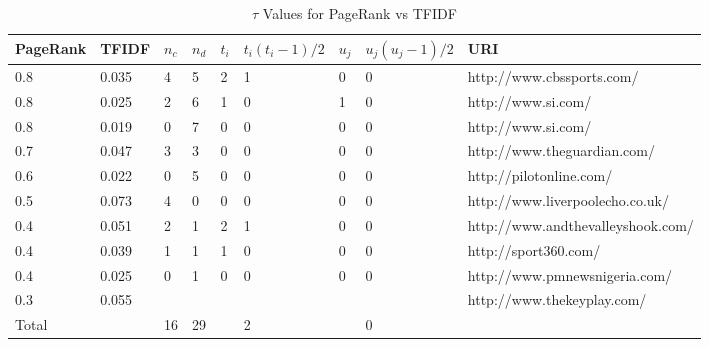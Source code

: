 \begin{table}[!htbp]
\small
\caption{$\tau$ Values for PageRank vs TFIDF} \label{tab:table3}
\begin{center}
\begin{tabular}{l | l | l | l | l | l | l | l | l}
\hline
PageRank & TFIDF & $n_c$ & $n_d$ & $t_i$ & $t_i(t_i - 1)/2$ & $u_j$ & $u_j(u_j - 1)/2$ & URI\\
\hline
0.8	& 0.035	& 4	& 5 & 2 & 1 & 0 & 0 & http://www.cbssports.com/\\
0.8	& 0.025	& 2	& 6	& 1	& 0 & 1 & 0 & http://www.si.com/\\
0.8	& 0.019 & 0	& 7	& 0	& 0 & 0 & 0 & http://www.si.com/\\
0.7	& 0.047 & 3	& 3	& 0	& 0 & 0 & 0 & http://www.theguardian.com/\\
0.6	& 0.022 & 0	& 5	& 0	& 0 & 0 & 0 & http://pilotonline.com/\\
0.5	& 0.073 & 4	& 0	& 0	& 0 & 0 & 0 & http://www.liverpoolecho.co.uk/\\
0.4	& 0.051 & 2	& 1	& 2	& 1 & 0 & 0 & http://www.andthevalleyshook.com/\\
0.4	& 0.039 & 1	& 1	& 1	& 0 & 0 & 0 & http://sport360.com/\\
0.4	& 0.025 & 0	& 1	& 0	& 0 & 0 & 0 & http://www.pmnewsnigeria.com/\\
0.3	& 0.055 &   &   &   &  &   &   & http://www.thekeyplay.com/\\
\hline
\hline
\multicolumn{1}{l}{Total} &	\multicolumn{1}{l}{}	& \multicolumn{1}{l}{16} & \multicolumn{1}{l}{29}& \multicolumn{1}{l}{} & \multicolumn{1}{l}{2} & \multicolumn{1}{l}{} & \multicolumn{1}{l}{0} \\	
\end{tabular}
\end{center}
\end{table}